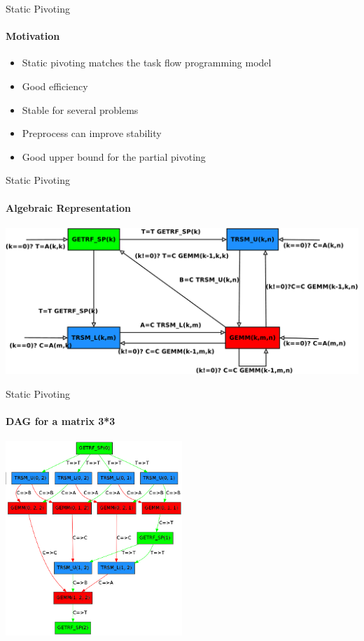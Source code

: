 \begin{frame}{Static Pivoting}
\framesubtitle{Motivation}
\begin{itemize}
\item Static pivoting matches the task flow programming model
\item Good efficiency
\item Stable for several problems
\item Preprocess can improve stability
\item Good upper bound for the partial pivoting
\end{itemize}
\end{frame}

\begin{frame}{Static Pivoting}
\framesubtitle{Algebraic Representation}
\begin{center}
\includegraphics[scale=0.2]{dag_getrf_sp.pdf} 
\end{center}
\end{frame}

\begin{frame}{Static Pivoting}
\framesubtitle{DAG for a matrix 3*3}
\begin{center}
\includegraphics[width=0.5\textwidth]{dag33.png} 
\end{center}
\end{frame}
